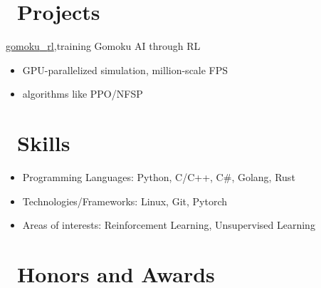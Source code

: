 \documentclass{resume}
\begin{document}
\section{\faRocket\ Projects}

\href{https://github.com/hesic73/gomoku_rl}{gomoku{\_}rl},training Gomoku AI through RL
\begin{itemize}
  \item GPU-parallelized simulation, million-scale FPS
  \item algorithms like PPO/NFSP
\end{itemize}


\section{\faCogs\ Skills}
\begin{itemize}[parsep=0.5ex]
  \item Programming Languages: Python, C/C++, C\#, Golang, Rust
  \item Technologies/Frameworks: Linux, Git, Pytorch
  \item Areas of interests: Reinforcement Learning, Unsupervised Learning
\end{itemize}

\section{\faHeartO\ Honors and Awards}


%
%
\end{document}
